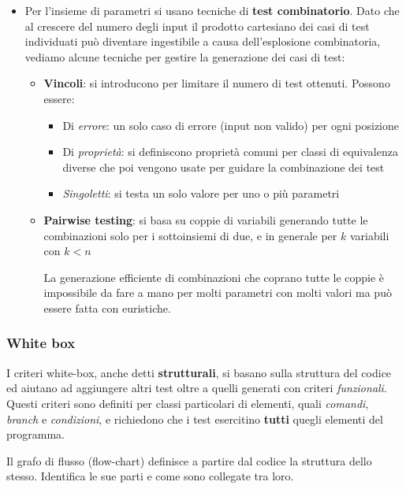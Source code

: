 \begin{enumerate}
\begin{itemize}
		\item Per l'insieme di parametri si usano tecniche di \textbf{test combinatorio}. Dato che al crescere del numero degli input il prodotto cartesiano dei casi di test individuati può diventare ingestibile a causa dell'esplosione combinatoria, vediamo alcune tecniche per gestire la generazione dei casi di test:
		\begin{itemize}
			\item \textbf{Vincoli}: si introducono per limitare il numero di test ottenuti. Possono essere:
			\begin{itemize}
				\item Di \textit{errore}: un solo caso di errore (input non valido) per ogni posizione
				\item Di \textit{proprietà}: si definiscono proprietà comuni per classi di equivalenza diverse che poi vengono usate per guidare la combinazione dei test
				\item \textit{Singoletti}: si testa un solo valore per uno o più parametri
			\end{itemize}
			\item \textbf{Pairwise testing}: si basa su coppie di variabili generando tutte le combinazioni solo per i sottoinsiemi di due, e in generale per $k$ variabili con $k<n$
			
			\begin{note}
				La generazione efficiente di combinazioni che coprano tutte le coppie è impossibile da fare a mano per molti parametri con molti valori ma può essere fatta con euristiche.
			\end{note}
		\end{itemize}
	\end{itemize}
\end{enumerate}

\subsubsection{White box}
I criteri white-box, anche detti \textbf{strutturali}, si basano sulla struttura del codice ed aiutano ad aggiungere altri test oltre a quelli generati con criteri \textit{funzionali}.\\
Questi criteri sono definiti per classi particolari di elementi, quali \textit{comandi}, \textit{branch} e \textit{condizioni}, e richiedono che i test esercitino \textbf{tutti} quegli elementi del programma.

\begin{definition}
	Il grafo di flusso (flow-chart) definisce a partire dal codice la struttura dello stesso. Identifica le sue parti e come sono collegate tra loro.
\end{definition}

